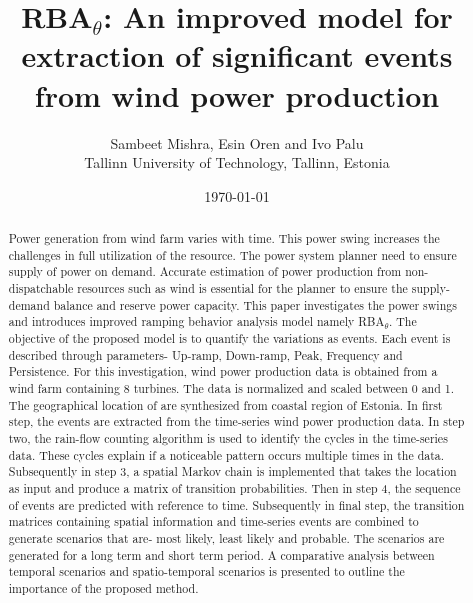 \documentclass[11pt]{article}
\begin{document}
\title{RBA$_\theta$: An improved model for extraction of significant events from wind power production}
\author{
        Sambeet Mishra, Esin Oren and Ivo Palu\\
    Tallinn University of Technology, Tallinn, Estonia
}
\date{\today}
\maketitle

\begin{abstract}
Power generation from wind farm varies with time. This power swing increases the challenges in full utilization of the resource. The power system planner need to ensure supply of power on demand. Accurate estimation of power production from non-dispatchable resources such as wind is essential for the planner to ensure the supply-demand balance and reserve power capacity. This paper investigates the power swings and introduces improved ramping behavior analysis model namely RBA$_\theta$. The objective of the proposed model is to quantify the variations as events. Each event is described through parameters- Up-ramp, Down-ramp, Peak, Frequency and Persistence. For this investigation, wind power production data is obtained from a wind farm containing 8 turbines. The data is normalized and scaled between 0 and 1. The geographical location of are synthesized from coastal region of Estonia. In first step, the events are extracted from the time-series wind power production data. In step two, the rain-flow counting algorithm is used to identify the cycles in the time-series data. These cycles explain if a noticeable pattern occurs multiple times in the data. Subsequently in step 3, a spatial Markov chain is implemented that takes the location as input and produce a matrix of transition probabilities. Then in step 4, the sequence of events are predicted with reference to time. Subsequently in final step, the transition matrices containing spatial information and time-series events are combined to generate scenarios that are- most likely, least likely and probable. The scenarios are generated for a long term and short term period. A comparative analysis between temporal scenarios and spatio-temporal scenarios is presented to outline the importance of the proposed method. 
\end{abstract}
\end{document}
